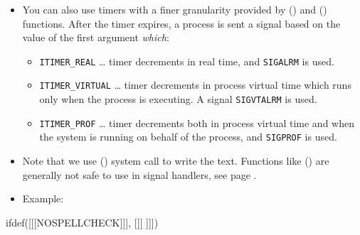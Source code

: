 \begin{itemize}
\item You can also use timers with a finer granularity provided by
() and () functions.  After the timer expires,
a process is sent a signal based on the value of the first argument
\emph{which}:
\begin{itemize}
\item \texttt{ITIMER\_REAL} \dots{} timer decrements in real time, and
\texttt{SIGALRM} is used.
\item \texttt{ITIMER\_VIRTUAL} \dots{} timer decrements in process virtual time
which runs only when the process is executing.  A signal \texttt{SIGVTALRM} is
used.
\item \texttt{ITIMER\_PROF} \dots{} timer decrements both in process virtual
time and when the system is running on behalf of the process, and
\texttt{SIGPROF} is used.
\end{itemize}
\item Note that we use () system call to write the text.  Functions
like () are generally not safe to use in signal handlers, see page
\pageref{ASYNCSIGNALSAFE}.
\item Example: 
\end{itemize}


ifdef([[[NOSPELLCHECK]]], [[[
]]])


